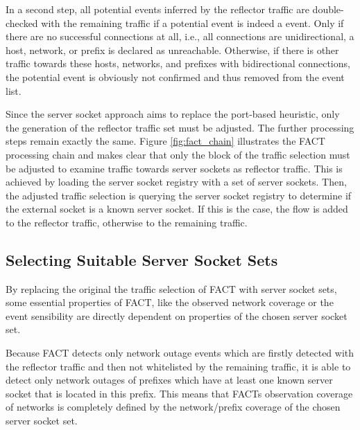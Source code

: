 In a second step, all potential events inferred by the reflector traffic are  double-checked with the remaining traffic if a potential event is indeed a  event. 
Only if there are no successful connections at all, i.e., all connections are unidirectional, a host, network, or prefix is declared as unreachable. 
Otherwise, if there is other traffic towards these hosts, networks, and prefixes with bidirectional connections, the potential event is obviously not confirmed and thus removed from the event list. 

Since the \gls{server socket} approach aims to replace the port-based heuristic,  only the generation of the reflector traffic set must be adjusted. 
The further processing steps remain exactly the same. 
Figure \ref{fig:fact_chain} illustrates the \gls{FACT} processing chain and makes clear that only the block of the traffic selection must be adjusted to examine traffic towards \glspl{server socket} as reflector traffic. 
This is achieved by loading the \gls{server socket} registry with a set of \glspl{server socket}. 
Then, the adjusted traffic selection is querying the server socket registry to determine if the external socket is a known \gls{server socket}. 
If this is the case, the flow is added to the reflector traffic, otherwise to the remaining traffic. 

\subsection{Selecting Suitable Server Socket Sets\label{section:ses_selection}}
By replacing the original the traffic selection of \gls{FACT} with \gls{server socket} sets,  some essential properties of \gls{FACT}, like the observed network coverage or the event sensibility are directly dependent on properties of the chosen \gls{server socket} set. 

Because \gls{FACT} detects only network outage events which are firstly detected  with the reflector traffic and then not whitelisted by the remaining traffic, it  is able to detect only network outages of prefixes which have at least one known  server socket that is located in this prefix. This means that FACTs observation  coverage of networks is completely defined by the network/prefix coverage of the  chosen \gls{server socket} set. 

